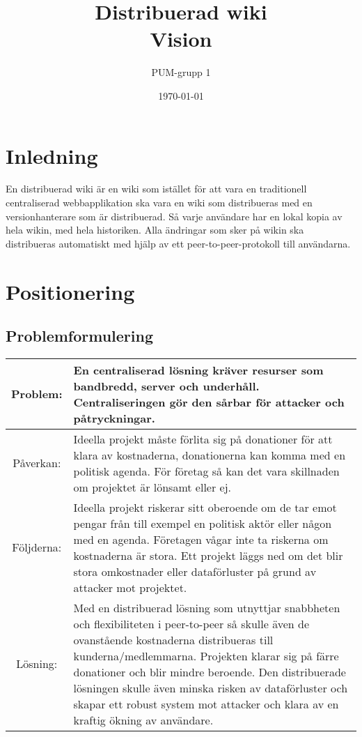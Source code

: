 

\ifpdf
\else
\fi

\title{Distribuerad wiki \\ Vision}
\author{PUM-grupp 1}
\date{\today}



\maketitle

\thispagestyle{empty}

\newpage

\section{Inledning}
En distribuerad wiki är en wiki som istället för att vara en traditionell centraliserad webbapplikation ska vara en wiki som distribueras med en versionhanterare som är distribuerad. Så varje användare har en lokal kopia av hela wikin, med hela historiken. Alla ändringar som sker på wikin ska distribueras automatiskt med hjälp av ett peer-to-peer-protokoll till användarna.
\section{Positionering}

\subsection{Problemformulering}
\begin{tabular}{|c|m{15 cm}|}
\hline
Problem: & En centraliserad lösning kräver resurser som bandbredd, server och underhåll. Centraliseringen gör den sårbar för attacker och påtryckningar. \\
\hline
Påverkan: & Ideella projekt måste förlita sig på donationer för att klara av kostnaderna, donationerna kan komma med en politisk agenda. För företag så kan det vara skillnaden om projektet är lönsamt eller ej.   \\
\hline
Följderna: & Ideella projekt riskerar sitt oberoende om de tar emot pengar från till exempel en politisk aktör eller någon med en agenda. Företagen vågar inte ta riskerna om kostnaderna är stora. Ett projekt läggs ned om det blir stora omkostnader eller dataförluster på grund av attacker mot projektet. \\
\hline
Lösning: & Med en distribuerad lösning som utnyttjar snabbheten och flexibiliteten i peer-to-peer så skulle även de ovanstående kostnaderna distribueras till kunderna/medlemmarna. Projekten klarar sig på färre donationer och blir mindre beroende. Den distribuerade lösningen skulle även minska risken av dataförluster och skapar ett robust system mot attacker och klara av en kraftig ökning av användare. \\
\hline
\end{tabular}

